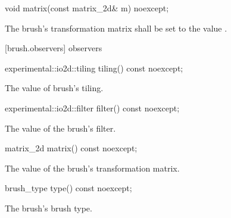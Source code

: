 \begin{itemdecl}
void matrix(const matrix_2d& m) noexcept;
\end{itemdecl}
\begin{itemdescr}
\pnum
\effects
The brush's transformation matrix shall be set to the value .
\end{itemdescr}

 [brush.observers]{ observers}

\begin{itemdecl}
experimental::io2d::tiling tiling() const noexcept;
\end{itemdecl}
\begin{itemdescr}
\pnum
\returns
The value of brush's tiling.
\end{itemdescr}

\begin{itemdecl}
experimental::io2d::filter filter() const noexcept;
\end{itemdecl}
\begin{itemdescr}
\pnum
\returns
The value of the brush's filter.
\end{itemdescr}

\begin{itemdecl}
matrix_2d matrix() const noexcept;
\end{itemdecl}
\begin{itemdescr}
\pnum
\returns
The value of the brush's transformation matrix.
\end{itemdescr}

\begin{itemdecl}
brush_type type() const noexcept;
\end{itemdecl}
\begin{itemdescr}
\pnum
\returns
The brush's brush type.
\end{itemdescr}
